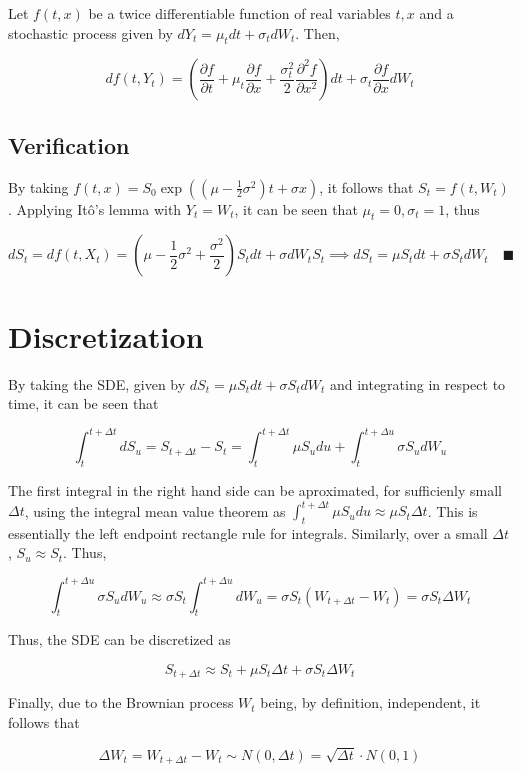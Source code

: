 \documentclass[11pt,oneside,parskip=half]{scrbook}  %
\begin{document}
Let $f(t,x)$ be a twice differentiable function of real variables $t,x$ and a stochastic process given by $dY_t=\mu_t dt+\sigma_t dW_t$. Then,

$$
df(t,Y_t)=\left(\frac{\partial f}{\partial t}+\mu_t\frac{\partial f}{\partial x}+\frac{\sigma_t^2}{2}\frac{\partial^2 f}{\partial x^2}\right)dt + \sigma_t\frac{\partial f}{\partial x}dW_t
$$

\section{Verification}

By taking $f(t,x)=S_0\exp\left(\left( \mu-\frac12\sigma^2\right)t+\sigma x\right)$, it follows that $S_t=f(t,W_t)$.
Applying Itô's lemma with $Y_t=W_t$, it can be seen that $\mu_t=0,\sigma_t=1$, thus

$$
dS_t=df(t, X_t)=\left(\mu-\frac12\sigma^2 + \frac{\sigma^2}2\right)S_tdt + \sigma dW_tS_t \implies dS_t=\mu S_tdt + \sigma S_tdW_t\quad\blacksquare
$$

\chapter{Discretization}

By taking the SDE, given by $dS_t=\mu S_t dt+ \sigma S_tdW_t$ and integrating in respect to time, it can be seen that

$$
\int_t^{t+\Delta t}dS_u= S_{t+\Delta t}-S_t=\int_t^{t+\Delta t}\mu S_u du+ \int_t^{t+\Delta u}\sigma S_udW_u
$$

The first integral in the right hand side can be aproximated, for sufficienly small $\Delta t$, using the integral mean value theorem as $\int_t^{t+\Delta t}\mu S_u du\approx\mu S_t\Delta t$. This is essentially the left endpoint rectangle rule for integrals. Similarly, over a small $\Delta t$, $S_u\approx S_t$. Thus,

$$
\int_t^{t+\Delta u}\sigma S_udW_u\approx \sigma S_t\int_t^{t+\Delta u}dW_u=\sigma S_t(W_{t+\Delta t}-W_t)=\sigma S_t \Delta W_t
$$

Thus, the SDE can be discretized as

$$
S_{t+\Delta t}\approx S_t + \mu S_t\Delta t + \sigma S_t \Delta W_t
$$

Finally, due to the Brownian process $W_t$ being, by definition, independent, it follows that

$$
\Delta W_t=W_{t+\Delta t}-W_t\sim N(0,\Delta t) = \sqrt{\Delta t} \cdot N(0,1)
$$
\end{document}
